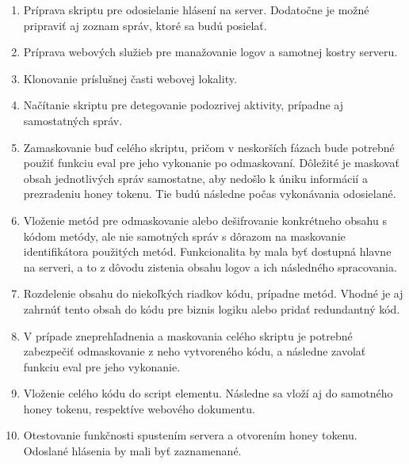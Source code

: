 \documentclass[conference, 11pt,slovak,a4paper,twoside]{IEEEtran}
\begin{document}
\begin{enumerate}
	\item Príprava skriptu pre odosielanie hlásení na server. Dodatočne je možné pripraviť aj zoznam správ, ktoré sa budú posielať.

	\item Príprava webových služieb pre manažovanie logov a samotnej kostry serveru.
	
	\item Klonovanie príslušnej časti webovej lokality.
	
	\item Načítanie skriptu pre detegovanie podozrivej aktivity, prípadne aj samostatných správ. 
	
	\item Zamaskovanie buď celého skriptu, pričom v neskorších fázach bude potrebné použiť funkciu eval pre jeho vykonanie po odmaskovaní. Dôležité je maskovať obsah jednotlivých správ samostatne, aby nedošlo k úniku informácií a prezradeniu honey tokenu. Tie budú následne počas vykonávania odosielané. 
	
	\item Vloženie metód pre odmaskovanie alebo dešifrovanie konkrétneho obsahu s kódom metódy, ale nie samotných správ s dôrazom na maskovanie identifikátora použitých metód. Funkcionalita by mala byť dostupná hlavne na serveri, a to z dôvodu zistenia obsahu logov a ich následného spracovania.
	
	\item Rozdelenie obsahu do niekoľkých riadkov kódu, prípadne metód. Vhodné je aj zahrnúť tento obsah do kódu pre biznis logiku alebo pridať redundantný kód.
	
	\item V prípade zneprehľadnenia a maskovania celého skriptu je potrebné zabezpečiť odmaskovanie z neho vytvoreného kódu, a následne zavolať funkciu eval pre jeho vykonanie.
	
	\item Vloženie celého kódu do script elementu. Následne sa vloží aj do samotného honey tokenu, respektíve webového dokumentu.
	
	\item Otestovanie funkčnosti spustením servera a otvorením honey tokenu. Odoslané hlásenia by mali byť zaznamenané.
\end{enumerate}
\end{document}
